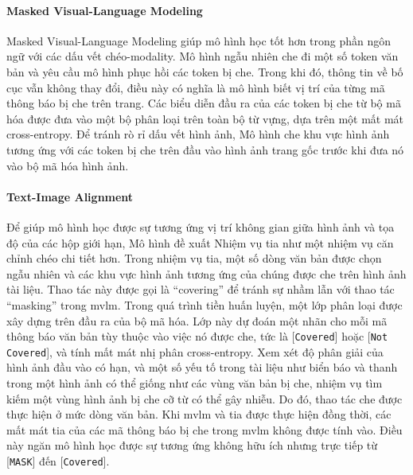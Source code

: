\paragraph*{Masked Visual-Language Modeling}
Masked Visual-Language Modeling giúp mô hình học tốt hơn trong phần ngôn ngữ với các dấu vết chéo-modality. Mô hình ngẫu nhiên che đi một số token văn bản và yêu cầu mô hình phục hồi các token bị che. Trong khi đó, thông tin về bố cục vẫn không thay đổi, điều này có nghĩa là mô hình biết vị trí của từng mã thông báo bị che trên trang. Các biểu diễn đầu ra của các token bị che từ bộ mã hóa được đưa vào một bộ phân loại trên toàn bộ từ vựng, dựa trên một mất mát cross-entropy. Để tránh rò rỉ dấu vết hình ảnh, Mô hình che khu vực hình ảnh tương ứng với các token bị che trên đầu vào hình ảnh trang gốc trước khi đưa nó vào bộ mã hóa hình ảnh.

\paragraph*{Text-Image Alignment}
Để giúp mô hình học được sự tương ứng vị trí không gian giữa hình ảnh và tọa độ của các hộp giới hạn, Mô hình đề xuất Nhiệm vụ \acrfull*{tia} như một nhiệm vụ căn chỉnh chéo chi tiết hơn. Trong nhiệm vụ \acrshort*{tia}, một số dòng văn bản được chọn ngẫu nhiên và các khu vực hình ảnh tương ứng của chúng được che trên hình ảnh tài liệu. Thao tác này được gọi là ``covering'' để tránh sự nhầm lẫn với thao tác ``masking'' trong \acrshort*{mvlm}. Trong quá trình tiền huấn luyện, một lớp phân loại được xây dựng trên đầu ra của bộ mã hóa. Lớp này dự đoán một nhãn cho mỗi mã thông báo văn bản tùy thuộc vào việc nó được che, tức là [\texttt{Covered}] hoặc [\texttt{Not Covered}], và tính mất mát nhị phân cross-entropy. Xem xét độ phân giải của hình ảnh đầu vào có hạn, và một số yếu tố trong tài liệu như biển báo và thanh trong một hình ảnh có thể giống như các vùng văn bản bị che, nhiệm vụ tìm kiếm một vùng hình ảnh bị che cỡ từ có thể gây nhiễu. Do đó, thao tác che được thực hiện ở mức dòng văn bản. Khi \acrshort*{mvlm} và \acrshort*{tia} được thực hiện đồng thời, các mất mát \acrshort*{tia} của các mã thông báo bị che trong \acrshort*{mvlm} không được tính vào. Điều này ngăn mô hình học được sự tương ứng không hữu ích nhưng trực tiếp từ [\texttt{MASK}] đến [\texttt{Covered}].

